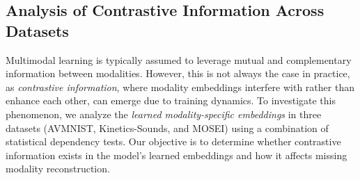 \subsection{Analysis of Contrastive Information Across Datasets}\label{sec:contrastive_info}

Multimodal learning is typically assumed to leverage mutual and complementary information between modalities. However, this is not always the case in practice, as \textit{contrastive information}, where modality embeddings interfere with rather than enhance each other, can emerge due to training dynamics. To investigate this phenomenon, we analyze the \textit{learned modality-specific embeddings} in three datasets (AVMNIST, Kinetics-Sounds, and MOSEI) using a combination of statistical dependency tests. Our objective is to determine whether contrastive information exists in the model’s learned embeddings and how it affects missing modality reconstruction.

